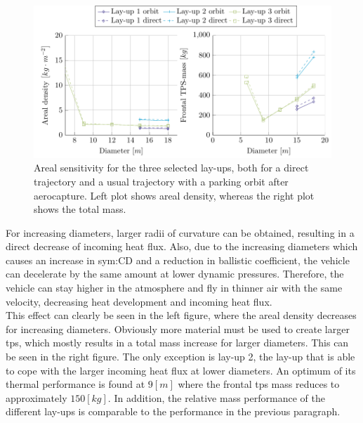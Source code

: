 \begin{figure}[h]
	\centering
	\includegraphics{./Figure/Thermal/SensitivityA.pdf}
	\caption[Areal sensitivity for the three selected lay-ups]{Areal sensitivity for the three selected lay-ups, both for a direct trajectory and a usual trajectory with a parking orbit after aerocapture. Left plot shows areal density, whereas the right plot shows the total mass.}
	\label{fig:sensitivityA}
\end{figure}

For increasing diameters, larger radii of curvature can be obtained, resulting in a direct decrease of incoming heat flux. Also, due to the increasing diameters which causes an increase in \gls{sym:CD} and a reduction in ballistic coefficient, the vehicle can decelerate by the same amount at lower dynamic pressures. Therefore, the vehicle can stay higher in the atmosphere and fly in thinner air with the same velocity, decreasing heat development and incoming heat flux.\\

This effect can clearly be seen in the left figure, where the areal density decreases for increasing diameters. Obviously more material must be used to create larger \gls{tps}, which mostly results in a total mass increase for larger diameters. This can be seen in the right figure. The only exception is lay-up 2, the lay-up that is able to cope with the larger incoming heat flux at lower diameters. An optimum of its thermal performance is found at $9 \left[ m \right]$ where the frontal \gls{tps} mass reduces to approximately $150 \left[ kg \right]$. In addition, the relative mass performance of the different lay-ups is comparable to the performance in the previous paragraph.

